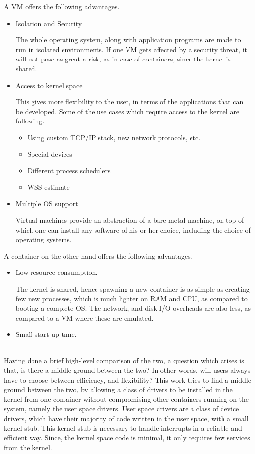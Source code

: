 \documentclass[twoside]{iitbreport}
\begin{document}
A VM offers the following advantages.
\begin{itemize}
\item Isolation and Security

The whole operating system, along with application programs are made to run in isolated environments. If one VM gets affected by a security threat, it will not pose as great a risk, as in case of containers, since the kernel is shared.
\item Access to kernel space

This gives more flexibility to the user, in terms of the applications that can be developed. Some of the use cases which require access to the kernel are following.
\begin{itemize}
\item Using custom TCP/IP stack, new network protocols, etc.
\item Special devices
\item Different process schedulers
\item WSS estimate

\end{itemize}
\item Multiple OS support

Virtual machines provide an abstraction of a bare metal machine, on top of which one can install any software of his or her choice, including the choice of operating systems.
\end{itemize}
A container on the other hand offers the following advantages.
\begin{itemize}
\item Low resource consumption.

The kernel is shared, hence spawning a new container is as simple as creating few new processes, which is much lighter on RAM and CPU, as compared to booting a complete OS. The network, and disk I/O overheads are also less, as compared to a VM where these are emulated.

\item Small start-up time.\\\\
\end{itemize}

Having done a brief high-level comparison of the two, a question which arises is that, is there a middle ground between the two? In other words, will users always have to choose between efficiency, and flexibility?
This work tries to find a middle ground between the two, by allowing a class of drivers to be installed in the kernel from one container without compromising other containers running on the system, namely the user space drivers.
User space drivers are a class of device drivers, which have their majority of code written in the user space, with a small kernel stub. This kernel stub is necessary to handle interrupts in a reliable and efficient way. Since, the kernel space code is minimal, it only requires few services from the kernel.
\end{document}
